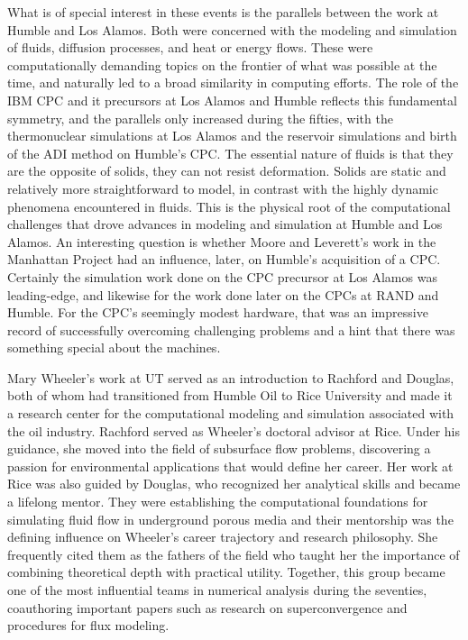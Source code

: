 What is of special interest in these events is the parallels between the work at Humble and Los Alamos. Both were concerned with the modeling and simulation of fluids, diffusion processes, and heat or energy flows. These were computationally demanding topics on the frontier of what was possible at the time, and naturally led to a broad similarity in computing efforts. The role of the IBM CPC and it precursors at Los Alamos and Humble reflects this fundamental symmetry, and the parallels only increased during the fifties, with the thermonuclear simulations at Los Alamos and the reservoir simulations and birth of the ADI method on Humble's CPC. The essential nature of fluids is that they are the opposite of solids, they can not resist deformation. Solids are static and relatively more straightforward to model, in contrast with the highly dynamic phenomena encountered in fluids. This is the physical root of the computational challenges that drove advances in modeling and simulation at Humble and Los Alamos. An interesting question is whether Moore and Leverett's work in the Manhattan Project had an influence, later, on Humble's acquisition of a CPC. Certainly the simulation work done on the CPC precursor at Los Alamos was leading-edge, and likewise for the work done later on the CPCs at RAND and Humble. For the CPC's seemingly modest hardware, that was an impressive record of successfully overcoming challenging problems and a hint that there was something special about the machines. 

Mary Wheeler's work at UT served as an introduction to Rachford and Douglas, both of whom had transitioned from Humble Oil to Rice University and made it a research center for the computational modeling and simulation associated with the oil industry. Rachford served as Wheeler's doctoral advisor at Rice. Under his guidance, she moved into the field of subsurface flow problems, discovering a passion for environmental applications that would define her career. Her work at Rice was also guided by Douglas, who recognized her analytical skills and became a lifelong mentor. They were establishing the computational foundations for simulating fluid flow in underground porous media and their mentorship was the defining influence on Wheeler's career trajectory and research philosophy. She frequently cited them as the fathers of the field who taught her the importance of combining theoretical depth with practical utility. Together, this group became one of the most influential teams in numerical analysis during the seventies, coauthoring important papers such as research on superconvergence and procedures for flux modeling. \cite{wheelerGalerkinProcedureEstimating1974} \cite{rachfordInverseHGalerkinProcedure1974}

